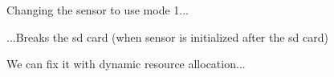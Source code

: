 \documentclass[xcolor=svgnames]{beamer}
\begin{document}



{%
%
\begin{frame}{\subsecname}
    \begin{minipage}{\columnwidth}
    \end{minipage}
\end{frame}
}




{%
%
\begin{frame}{\subsecname}
    Changing the sensor to use mode 1...
    \begin{minipage}{\columnwidth}
    \end{minipage}
    ...Breaks the sd card (when sensor is initialized after the sd card)
\end{frame}
}



{%
%
\begin{frame}{\subsecname}
    \begin{minipage}{\columnwidth}
        We can fix it with dynamic resource allocation...
    \end{minipage}
\end{frame}
}
\end{document}
